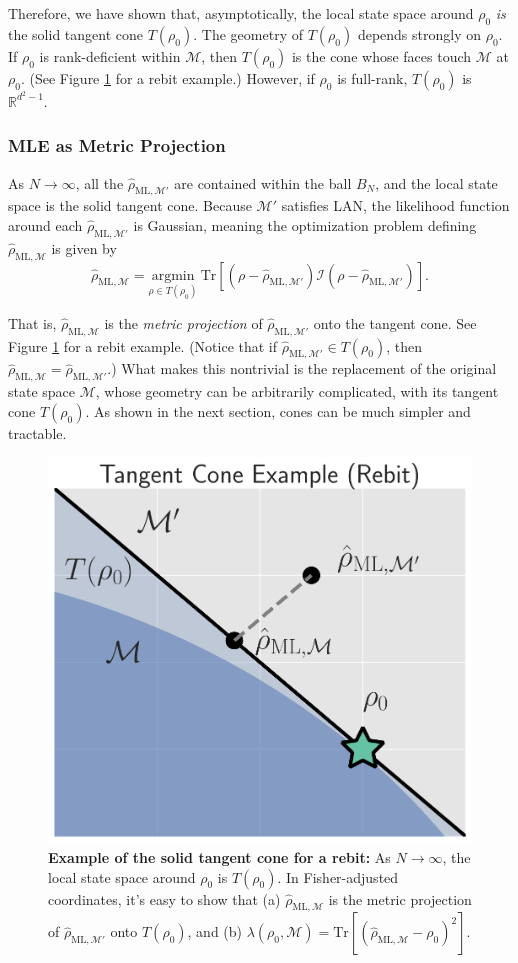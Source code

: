 \documentclass[aps,pra, twocolumn]{revtex4-1}
\newcommand{\M}{\mathcal{M}}
\newcommand{\rhohat}{\hat{\rho}}
\newcommand{\rhoML}[1]{\rhohat_{\scriptscriptstyle{\mathrm{ML},#1}}}
\begin{document}
Therefore, we have shown that, asymptotically, the local state space around $\rho_{0}$ \emph{is} the solid tangent cone $T(\rho_{0})$.
The geometry of $T(\rho_{0})$ depends strongly on $\rho_{0}$. If $\rho_{0}$ is rank-deficient within $\M$, then $T(\rho_{0})$ is the cone whose faces touch $\M$ at $\rho_{0}$. (See Figure \ref{fig:tangentcone} for a rebit example.) However, if $\rho_{0}$ is full-rank, $T(\rho_{0})$ is $\mathbb{R}^{d^{2}-1}$.

\subsubsection{MLE as Metric Projection}

As $N \rightarrow \infty$, all the $\rhoML{\M'}$ are contained within the ball $B_{N}$, and the local state space is the solid tangent cone. Because $\M'$ satisfies LAN, the likelihood function around each $\rhoML{\M'}$ is Gaussian, meaning the optimization problem defining $\rhoML{\M}$ is given by \begin{equation}
\label{eq:MP-LANmle2}
\rhoML{\M} = \underset{\rho \in T(\rho_{0})}{\text{argmin}}~\mathrm{Tr}[(\rho  -\rhoML{\M'})\mathcal{I}(\rho  -\rhoML{\M'})].
\end{equation}

That is, $\rhoML{\M}$ is the \emph{metric projection} of $\rhoML{\M'}$ onto the tangent cone. See Figure \ref{fig:tangentcone} for a rebit example. (Notice that if $\rhoML{\M'} \in T(\rho_{0})$, then $\rhoML{\M} = \rhoML{\M'}$.) What makes this  nontrivial is the replacement of the original state space $\M$, whose geometry can be arbitrarily complicated, with its tangent cone $T(\rho_{0})$. As shown in the next section, cones can be much simpler and tractable.

\begin{figure}
\includegraphics[width=.75\columnwidth]{Images/Figure_4.pdf}
 \caption{\textbf{Example of the solid tangent cone for a rebit:} As $N \rightarrow \infty$, the local state space around $\rho_{0}$ is $T(\rho_{0})$. In Fisher-adjusted coordinates, it's easy to show that (a) $\rhoML{\M}$ is the metric projection of $\rhoML{\M'}$ onto $T(\rho_{0})$, and (b) $\lambda(\rho_{0}, \M) = \mathrm{Tr}[(\rhoML{\M} - \rho_{0})^{2}]$.}
\label{fig:tangentcone}
\end{figure}
\end{document}
